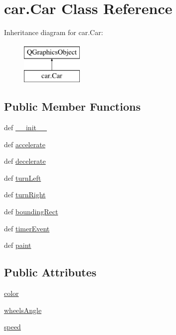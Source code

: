 \hypertarget{classcar_1_1Car}{}\section{car.\+Car Class Reference}
\label{classcar_1_1Car}
Inheritance diagram for car.\+Car\+:\begin{figure}[H]
\begin{center}
\leavevmode
\includegraphics[height=2.000000cm]{classcar_1_1Car}
\end{center}
\end{figure}
\subsection*{Public Member Functions}
\begin{DoxyCompactItemize}
\item 
def \hyperlink{classcar_1_1Car_a4cdcc411bb61616c8d18b849688b7a4f}{\+\_\+\+\_\+init\+\_\+\+\_\+}
\item 
def \hyperlink{classcar_1_1Car_a81e65013418d90df7db7ac9f206c0774}{accelerate}
\item 
def \hyperlink{classcar_1_1Car_af11d7c150ca29c948f4e1e90c67d0969}{decelerate}
\item 
def \hyperlink{classcar_1_1Car_a2a3e962328813fa25ae5ef341b974a23}{turn\+Left}
\item 
def \hyperlink{classcar_1_1Car_a996030a470d525c42301d4fb644b56b7}{turn\+Right}
\item 
def \hyperlink{classcar_1_1Car_a7cdac51fbd7635ecb1c35b6deec76e9f}{bounding\+Rect}
\item 
def \hyperlink{classcar_1_1Car_a75713609fbfb5c5f298db731770120a0}{timer\+Event}
\item 
def \hyperlink{classcar_1_1Car_a729e130f8c4c37495b7beaacf677e912}{paint}
\end{DoxyCompactItemize}
\subsection*{Public Attributes}
\begin{DoxyCompactItemize}
\item 
\hyperlink{classcar_1_1Car_a1b15e817d52d7701b69aff22db8e0c6d}{color}
\item 
\hyperlink{classcar_1_1Car_ac80508dbf587a7a685a70d645a0bacdb}{wheels\+Angle}
\item 
\hyperlink{classcar_1_1Car_ae9643e14576400287f5a98d95e6ebff7}{speed}
\end{DoxyCompactItemize}


